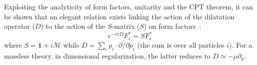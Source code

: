 \documentclass[prl,twocolumn,twoside,preprintnumbers,superscriptaddress, nofootinbib]{revtex4-2}
\renewcommand{\vec}[1]{{\mathbf #1}}
\newcommand{\txt}[1]{\textup{#1}}
\begin{document}
%
%
%
%
%
%
%
%
Exploiting the analyticity of form factors, unitarity and the CPT theorem, it can be shown that an elegant relation exists linking the action of the dilatation operator ($D$)
%
%
to the action of the $S$-matrix ($S$) on form factors~\cite{Caron-Huot:2016cwu}:
%
\begin{equation}
\label{eq:FundamentalRelation}
    e^{-i \pi D}F_i^* = SF_i^*
\end{equation}
%
where $S=\mathbf{1} + i\mathcal{M}$ while 
$D = \sum_{i}p_i\cdot \partial/\partial p_i$
(the sum is over all particles $i$).
For a massless theory, in dimensional regularization, 
the latter reduces to $D \simeq -\mu \partial_\mu$. 
\end{document}
